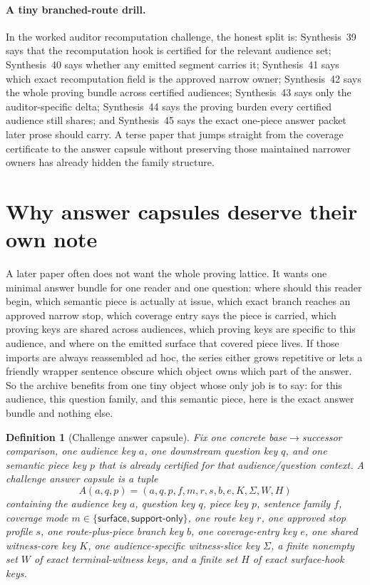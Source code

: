 \documentclass[11pt]{article}
\newtheorem{definition}{Definition}
\begin{document}
\paragraph{A tiny branched-route drill.}
In the worked auditor recomputation challenge, the honest split is: Synthesis~39 says that the recomputation hook is certified for the relevant audience set; Synthesis~40 says whether any emitted segment carries it; Synthesis~41 says which exact recomputation field is the approved narrow owner; Synthesis~42 says the whole proving bundle across certified audiences; Synthesis~43 says only the auditor-specific delta; Synthesis~44 says the proving burden every certified audience still shares; and Synthesis~45 says the exact one-piece answer packet later prose should carry. A terse paper that jumps straight from the coverage certificate to the answer capsule without preserving those maintained narrower owners has already hidden the family structure.

\section{Why answer capsules deserve their own note}
A later paper often does not want the whole proving lattice.
It wants one minimal answer bundle for one reader and one question: where should this reader begin, which semantic piece is actually at issue, which exact branch reaches an approved narrow stop, which coverage entry says the piece is carried, which proving keys are shared across audiences, which proving keys are specific to this audience, and where on the emitted surface that covered piece lives.
If those imports are always reassembled ad hoc, the series either grows repetitive or lets a friendly wrapper sentence obscure which object owns which part of the answer.
So the archive benefits from one tiny object whose only job is to say: for this audience, this question family, and this semantic piece, here is the exact answer bundle and nothing else.

\begin{definition}[Challenge answer capsule]
Fix one concrete base$\to$successor comparison, one audience key $a$, one downstream question key $q$, and one semantic piece key $p$ that is already certified for that audience/question context.
A \emph{challenge answer capsule} is a tuple
\[
A(a,q,p)=(a,q,p,f,m,r,s,b,e,K,\Sigma,W,H)
\]
containing the audience key $a$, question key $q$, piece key $p$, sentence family $f$, coverage mode $m\in\{\textsf{surface},\textsf{support-only}\}$, one route key $r$, one approved stop profile $s$, one route-plus-piece branch key $b$, one coverage-entry key $e$, one shared witness-core key $K$, one audience-specific witness-slice key $\Sigma$, a finite nonempty set $W$ of exact terminal-witness keys, and a finite set $H$ of exact surface-hook keys.
\end{definition}
\end{document}
